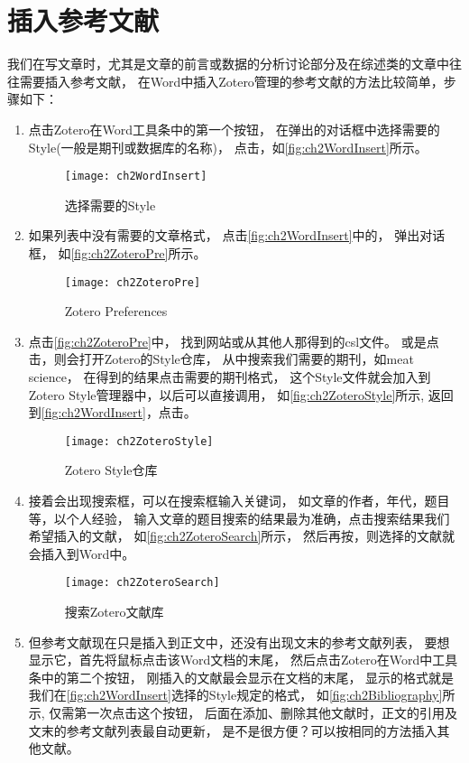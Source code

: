 \documentclass[cn,11pt,chinese]{elegantbook}
\begin{document}
		\section{插入参考文献}\label{sec:insertRef}
		我们在写文章时，尤其是文章的前言或数据的分析讨论部分及在综述类的文章中往往需要插入参考文献，
		在Word中插入Zotero管理的参考文献的方法比较简单，步骤如下：
		\begin{enumerate}
			\item
			点击Zotero在Word工具条中的第一个按钮，
			在弹出的对话框中选择需要的Style(一般是期刊或数据库的名称)，
			点击，如\autoref{fig:ch2WordInsert}所示。
			\begin{figure}[htbp]
				\centering
				\texttt{[image: ch2WordInsert]}
				\caption{选择需要的Style}
				\label{fig:ch2WordInsert}
			\end{figure}
			\item
			如果列表中没有需要的文章格式\label{tag:notyle}，
			点击\autoref{fig:ch2WordInsert}中的，
			弹出对话框，
			如\autoref{fig:ch2ZoteroPre}所示。
			\begin{figure}[htbp]
				\centering
				\texttt{[image: ch2ZoteroPre]}
				\caption{Zotero Preferences}
				\label{fig:ch2ZoteroPre}
			\end{figure}
			\item
			点击\autoref{fig:ch2ZoteroPre}中\menu{+}，
			找到网站或从其他人那得到的csl文件。
			或是点击，则会打开Zotero的Style仓库，
			从中搜索我们需要的期刊，如meat science，
			在得到的结果点击需要的期刊格式，
			这个Style文件就会加入到Zotero Style管理器中，以后可以直接调用，
			如\autoref{fig:ch2ZoteroStyle}所示,
			返回到\autoref{fig:ch2WordInsert}，点击。
			\begin{figure}[htbp]
				\centering
				\texttt{[image: ch2ZoteroStyle]}
				\caption{Zotero Style仓库}
				\label{fig:ch2ZoteroStyle}
			\end{figure}
			\item
			接着会出现搜索框，可以在搜索框输入关键词，
			如文章的作者，年代，题目等，以个人经验，
			输入文章的题目搜索的结果最为准确，点击搜索结果我们希望插入的文献，
			如\autoref{fig:ch2ZoteroSearch}所示，
			然后再按，则选择的文献就会插入到Word中。
			\begin{figure}[htbp]
				\centering
				\texttt{[image: ch2ZoteroSearch]}
				\caption{搜索Zotero文献库}
				\label{fig:ch2ZoteroSearch}
			\end{figure}
			\item
			但参考文献现在只是插入到正文中，还没有出现文末的参考文献列表，
			要想显示它，首先将鼠标点击该Word文档的末尾，
			然后点击Zotero在Word中工具条中的第二个按钮，
			刚插入的文献最会显示在文档的末尾，
			显示的格式就是我们在\autoref{fig:ch2WordInsert}选择的Style规定的格式，
			如\autoref{fig:ch2Bibliography}所示,
			仅需第一次点击这个按钮，
			后面在添加、删除其他文献时，正文的引用及文末的参考文献列表最自动更新，
			是不是很方便？可以按相同的方法插入其他文献。
			

\end{enumerate}
\end{document}

